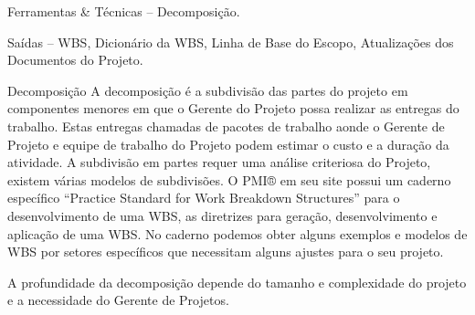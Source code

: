 \documentclass[12pt]{article}
\begin{document}
Ferramentas \& Técnicas – Decomposição.

Saídas – WBS, Dicionário da WBS, Linha de Base do Escopo, Atualizações dos Documentos do Projeto.

Decomposição
A decomposição é a subdivisão das partes do projeto em componentes menores em que o Gerente do Projeto possa realizar as entregas do trabalho. Estas entregas chamadas de pacotes de trabalho aonde o Gerente de Projeto e equipe de trabalho do Projeto podem estimar o custo e a duração da atividade.
A subdivisão em partes requer uma análise criteriosa do Projeto, existem várias modelos de subdivisões. O PMI® em seu site possui um caderno específico “Practice Standard for Work Breakdown Structures” para o desenvolvimento de uma WBS, as diretrizes para geração, desenvolvimento e aplicação de uma WBS. No caderno podemos obter alguns exemplos e modelos de WBS por setores específicos que necessitam alguns ajustes para o seu projeto.

A profundidade da decomposição depende do tamanho e complexidade do projeto e a necessidade do Gerente de Projetos.
\end{document}
